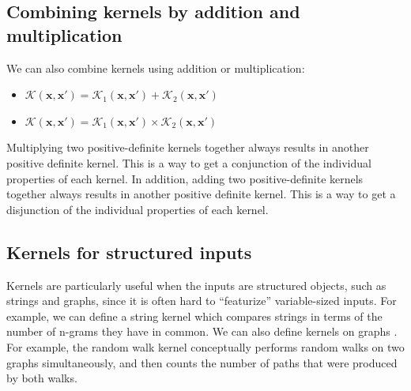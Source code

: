 \documentclass[twoside]{article}
\begin{document}
\subsection{Combining kernels by addition and multiplication}
We can also combine kernels using addition or multiplication:
\begin{itemize}
    \item $\mathcal{K}(\boldsymbol{x}, \boldsymbol{x'}) = \mathcal{K}_1(\boldsymbol{x}, \boldsymbol{x'}) + \mathcal{K}_2(\boldsymbol{x}, \boldsymbol{x'})$
    \item $\mathcal{K}(\boldsymbol{x}, \boldsymbol{x'}) = \mathcal{K}_1(\boldsymbol{x}, \boldsymbol{x'}) \times \mathcal{K}_2(\boldsymbol{x}, \boldsymbol{x'})$
\end{itemize}
Multiplying two positive-definite kernels together always results in another positive definite kernel. This is a way to get a conjunction of the individual properties of each kernel. In addition, adding two positive-definite kernels together always results in another positive definite
kernel. This is a way to get a disjunction of the individual properties of each kernel.
\subsection{Kernels for structured inputs}
Kernels are particularly useful when the inputs are structured objects, such as strings and graphs, since it is often hard to “featurize” variable-sized inputs. For example, we can define a string kernel which compares strings in terms of the number of n-grams they have in common.
We can also define kernels on graphs . For example, the random walk kernel conceptually performs random walks on two graphs simultaneously, and then counts the number of paths that were produced by both walks.
\end{document}
